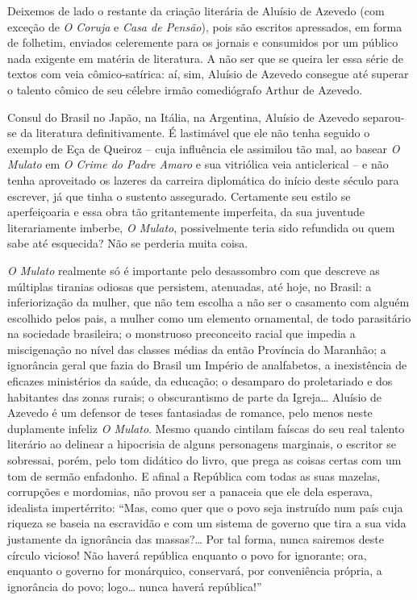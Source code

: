\documentclass[
  letterpaper,
  DIV=11,
  numbers=noendperiod]{scrreprt}
\begin{document}
Deixemos de lado o restante da criação literária de Aluísio de Azevedo
(com exceção de \emph{O Coruja} e \emph{Casa de Pensão}), pois são
escritos apressados, em forma de folhetim, enviados celeremente para os
jornais e consumidos por um público nada exigente em matéria de
literatura. A não ser que se queira ler essa série de textos com veia
cômico-satírica: aí, sim, Aluísio de Azevedo consegue até superar o
talento cômico de seu célebre irmão comediógrafo Arthur de Azevedo.

Consul do Brasil no Japão, na Itália, na Argentina, Aluísio de Azevedo
separou-se da literatura definitivamente. É lastimável que ele não tenha
seguido o exemplo de Eça de Queiroz -- cuja influência ele assimilou tão
mal, ao basear \emph{O Mulato} em \emph{O Crime do Padre Amaro} e sua
vitriólica veia anticlerical -- e não tenha aproveitado os lazeres da
carreira diplomática do início deste século para escrever, já que tinha
o sustento assegurado. Certamente seu estilo se aperfeiçoaria e essa
obra tão gritantemente imperfeita, da sua juventude literariamente
imberbe, \emph{O Mulato}, possivelmente teria sido refundida ou quem
sabe até esquecida? Não se perderia muita coisa.

\emph{O Mulato} realmente só é importante pelo desassombro com que
descreve as múltiplas tiranias odiosas que persistem, atenuadas, até
hoje, no Brasil: a inferiorização da mulher, que não tem escolha a não
ser o casamento com alguém escolhido pelos pais, a mulher como um
elemento ornamental, de todo parasitário na sociedade brasileira; o
monstruoso preconceito racial que impedia a miscigenação no nível das
classes médias da então Província do Maranhão; a ignorância geral que
fazia do Brasil um Império de analfabetos, a inexistência de eficazes
ministérios da saúde, da educação; o desamparo do proletariado e dos
habitantes das zonas rurais; o obscurantismo de parte da Igreja\ldots{}
Aluísio de Azevedo é um defensor de teses fantasiadas de romance, pelo
menos neste duplamente infeliz \emph{O Mulato}. Mesmo quando cintilam
faíscas do seu real talento literário ao delinear a hipocrisia de alguns
personagens marginais, o escritor se sobressai, porém, pelo tom didático
do livro, que prega as coisas certas com um tom de sermão enfadonho. E
afinal a República com todas as suas mazelas, corrupções e mordomias,
não provou ser a panaceia que ele dela esperava, idealista impertérrito:
``Mas, como quer que o povo seja instruído num país cuja riqueza se
baseia na escravidão e com um sistema de governo que tira a sua vida
justamente da ignorância das massas?\ldots{} Por tal forma, nunca
sairemos deste círculo vicioso! Não haverá república enquanto o povo for
ignorante; ora, enquanto o governo for monárquico, conservará, por
conveniência própria, a ignorância do povo; logo\ldots{} nunca haverá
república!''
\end{document}
